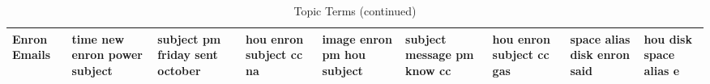 \documentclass[11pt,a4paper]{article}
\begin{document}
\begin{appendices}
\begin{table}[htb]
\begin{tiny}
\begin{tabular}{|p{}|p{}|p{}|p{}|p{}|p{}|p{}|p{}|p{}|}
    Enron Emails & time \newline new \newline enron \newline power \newline subject & subject \newline pm \newline friday \newline sent \newline october & hou \newline enron \newline subject \newline cc \newline na & image \newline enron \newline pm \newline hou \newline subject & subject \newline message \newline pm \newline know \newline cc & hou \newline enron \newline subject \newline cc \newline gas & space \newline alias \newline disk \newline enron \newline said & hou \newline disk \newline space \newline alias \newline e\\\hline
    \end{tabular}
\caption{Topic Terms (continued)}
\end{tiny}
\end{table}

\end{appendices}
\end{document}

